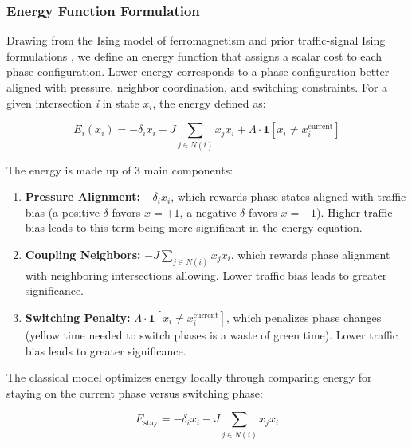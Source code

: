 \documentclass[12pt]{article}
\begin{document}
\subsubsection{Energy Function Formulation}

Drawing from the Ising model of ferromagnetism \cite{lucas2014} and prior traffic-signal Ising formulations \cite{inoue2021}, we define an energy function that assigns a scalar cost to each phase configuration. Lower energy corresponds to a phase configuration better aligned with pressure, neighbor coordination, and switching constraints. For a given intersection \emph{i} in state \(x_{i}\), the energy defined as:

\begin{equation}
\label{eq:energy}
    E_i(x_i) = -\delta_i x_i - J \sum_{j\in N(i)} x_j x_i + \Lambda \cdot \mathbf{1}[x_i \neq x_i^{\text{current}}]
\end{equation}



The energy is made up of 3 main components:

\begin{enumerate}

    \item \textbf{Pressure Alignment:} $-\delta_i x_i$, which rewards phase states aligned with traffic bias (a positive $\delta$ favors $x=+1$, a negative $\delta$ favors $x=-1$). Higher traffic bias leads to this term being more significant in the energy equation.


    \item \textbf{Coupling Neighbors:} $-J \sum_{j\in N(i)} x_j x_i$, which rewards phase alignment with neighboring intersections allowing. Lower traffic bias leads to greater significance.

    \item \textbf{Switching Penalty:} $\Lambda \cdot \mathbf{1}[x_i \neq x_i^{\text{current}}]$, which penalizes phase changes (yellow time needed to switch phases is a waste of green time). Lower traffic bias leads to greater significance.
  
\end{enumerate}

The classical model optimizes energy locally through comparing energy for staying on the current phase versus switching phase:

\begin{equation}
\label{eq:energy_stay}
    E_{\text{stay}} = -\delta_i x_i - J \sum_{j\in N(i)} x_j x_i
\end{equation}
\end{document}
